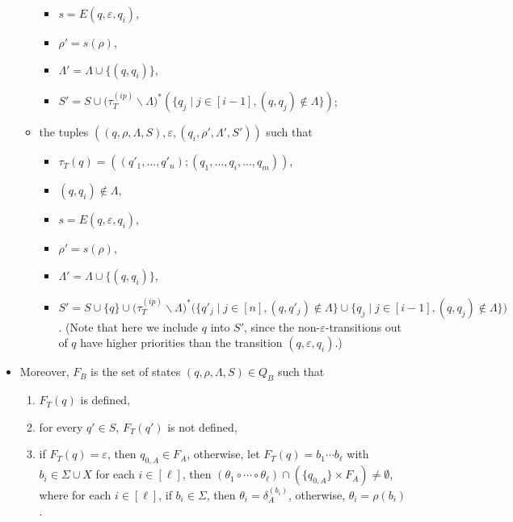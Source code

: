 \begin{itemize}
\begin{itemize}
\begin{itemize}
\item $s = E(q, \varepsilon, q_i)$, 
%
\item $\rho' = s(\rho)$,
%
\item $\Lambda' = \Lambda \cup \{(q, q_i)\}$, 
%
\item $S' =  S \cup \big(\tau^{(ip)}_T \backslash \Lambda \big)^\ast(\{ q_j \mid j \in [i-1], (q, q_j) \not \in \Lambda \})$;
%
\end{itemize}
%

\item the tuples $((q, \rho, \Lambda, S), \varepsilon, (q_i, \rho', \Lambda', S'))$ such that 
\begin{itemize}
%
\item $\tau_T (q) = ((q'_1, \ldots, q'_n); (q_1, \ldots, q_i, \ldots, q_m))$, 
%
\item $(q, q_i) \not \in \Lambda$,
%
\item $s = E(q, \varepsilon, q_i)$,
%
\item $\rho' = s(\rho)$,
%
\item $\Lambda' = \Lambda \cup \{(q, q_i)\}$, 
%
\item $S' = S \cup \{q\} \cup \big(\tau^{(ip)}_T \backslash \Lambda \big)^\ast\big(\big\{q'_j \mid j \in [n], (q, q'_j) \not \in \Lambda \big\} \cup \big\{q_j \mid j \in [i-1], (q, q_j) \not \in \Lambda \big\} \big)$. (Note that here we include $q$ into $S'$, since the non-$\varepsilon$-transitions out of $q$ have higher priorities than the transition $(q, \varepsilon, q_i)$.)
%
\end{itemize}
\end{itemize}
\item
Moreover, $F_B$ is the set of states $(q, \rho, \Lambda, S) \in Q_B$ such that
\begin{enumerate}
  \item $F_T (q)$ is defined,
%
  \item for every $q' \in S$, $F_T (q')$ is not defined,
  \item if $F_T(q) = \varepsilon$, then $q_{0, A}  \in F_A$, otherwise, 
let $F_T(q) = b_1 \cdots b_\ell$ with $b_i \in \Sigma \cup X$ for each $i \in [\ell]$, then $(\theta_1 \circ \cdots \circ \theta_\ell) \cap (\{q_{0,A}\} \times F_A) \neq \emptyset$, where for each $i \in [\ell]$, if $b_i \in \Sigma$, then $\theta_i = \delta^{(b_i)}_A$, otherwise, $\theta_i = \rho(b_i)$.
\end{enumerate}
\end{itemize}
